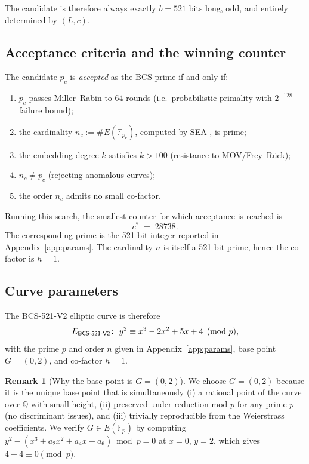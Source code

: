 \documentclass[11pt,a4paper]{article}
\theoremstyle{plain}
\theoremstyle{definition}
\newtheorem{remark}[theorem]{Remark}
\newcommand{\Q}{\mathbb{Q}}
\newcommand{\F}{\mathbb{F}}
\newcommand{\BCSV}{\textsf{BCS\hbox{-}521\hbox{-}V2}}
\begin{document}
The candidate is therefore always exactly $b = 521$ bits long, odd,
and entirely determined by $(L, c)$.

\subsection{Acceptance criteria and the winning counter}

The candidate $p_c$ is \emph{accepted} as the BCS prime if and only if:
\begin{enumerate}[label=(\Roman*)]
  \item $p_c$ passes Miller--Rabin to 64 rounds (i.e.\ probabilistic
    primality with $2^{-128}$ failure bound);
  \item the cardinality $n_c := \# E(\F_{p_c})$, computed by SEA
    \cite{SchoofElkiesAtkin}, is prime;
  \item the embedding degree $k$ satisfies $k > 100$ (resistance to
    MOV/Frey--R\"uck);
  \item $n_c \ne p_c$ (rejecting anomalous curves);
  \item the order $n_c$ admits no small co-factor.
\end{enumerate}

Running this search, the smallest counter for which acceptance is
reached is
\begin{equation}\label{eq:cstar}
  c^{*} \;=\; 28738.
\end{equation}
The corresponding prime is the 521-bit integer reported in
Appendix~\ref{app:params}. The cardinality $n$ is itself a 521-bit
prime, hence the co-factor is $h = 1$.

\subsection{Curve parameters}

The \BCSV{} elliptic curve is therefore
\begin{equation*}
  E_{\BCSV}\colon\ y^2 \equiv x^3 - 2 x^2 + 5 x + 4 \pmod{p},
\end{equation*}
with the prime $p$ and order $n$ given in
Appendix~\ref{app:params}, base point $G = (0, 2)$, and co-factor
$h = 1$.

\begin{remark}[Why the base point is $G = (0,2)$]
We choose $G = (0,2)$ because it is the unique base point that is
simultaneously (i) a rational point of the curve over $\Q$ with
small height, (ii) preserved under reduction mod $p$ for any prime
$p$ (no discriminant issues), and (iii) trivially reproducible from
the Weierstrass coefficients. We verify $G \in E(\F_p)$ by computing
$y^2 - (x^3 + a_2 x^2 + a_4 x + a_6) \bmod p = 0$ at $x = 0$, $y = 2$,
which gives $4 - 4 \equiv 0 \pmod{p}$.
\end{remark}
\end{document}
